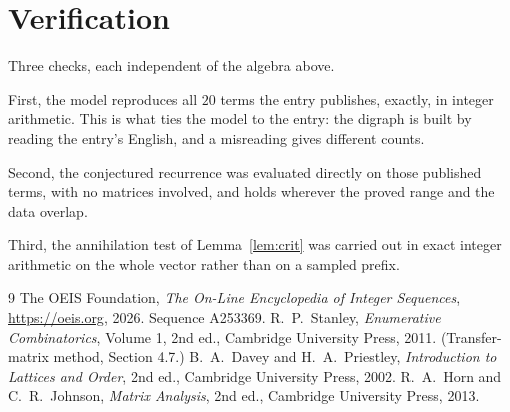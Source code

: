 \documentclass[11pt,a4paper]{article}
\theoremstyle{plain}
\theoremstyle{definition}
\begin{document}
\section{Verification}

Three checks, each independent of the algebra above.

First, the model reproduces all $20$ terms the entry publishes, exactly, in integer
arithmetic. This is what ties the model to the entry: the digraph is built by reading the
entry's English, and a misreading gives different counts.

Second, the conjectured recurrence was evaluated directly on those published terms, with no
matrices involved, and holds wherever the proved range and the data overlap.

Third, the annihilation test of Lemma~\ref{lem:crit} was carried out in exact integer
arithmetic on the whole vector rather than on a sampled prefix.

\begin{thebibliography}{9}
 The OEIS Foundation, \emph{The On-Line Encyclopedia of Integer
Sequences}, \url{https://oeis.org}, 2026. Sequence A253369.
 R.~P.~Stanley, \emph{Enumerative Combinatorics}, Volume 1, 2nd ed.,
Cambridge University Press, 2011. (Transfer-matrix method, Section 4.7.)
 B.~A.~Davey and H.~A.~Priestley, \emph{Introduction to Lattices and
Order}, 2nd ed., Cambridge University Press, 2002.
 R.~A.~Horn and C.~R.~Johnson, \emph{Matrix Analysis}, 2nd ed., Cambridge
University Press, 2013.
\end{thebibliography}
\end{document}
